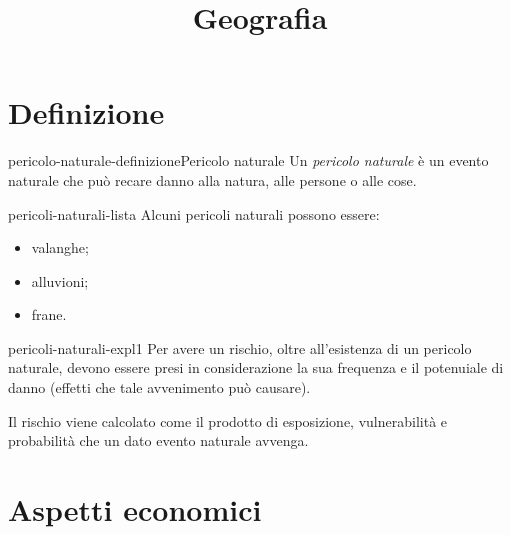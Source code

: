 \documentclass[preview]{standalone}
\begin{document}
\title{Geografia}
\genpage

\section{Definizione}

\begin{snippetdefinition}{pericolo-naturale-definizione}{Pericolo naturale}
    Un \textit{pericolo naturale} è un evento naturale che può recare danno alla
    natura, alle persone o alle cose.
\end{snippetdefinition}

\begin{snippet}{pericoli-naturali-lista}
    Alcuni pericoli naturali possono essere:
    \begin{itemize}
        \item valanghe;
        \item alluvioni;
        \item frane.
    \end{itemize}
\end{snippet}

\begin{snippet}{pericoli-naturali-expl1}
    Per avere un rischio, oltre all'esistenza di un pericolo naturale, devono essere presi
    in considerazione la sua frequenza e il potenuiale di danno (effetti che tale
    avvenimento può causare).

    Il rischio viene calcolato come il prodotto di
    esposizione, vulnerabilità e probabilità che un dato evento naturale avvenga.
\end{snippet}

\section{Aspetti economici}


\end{document}
